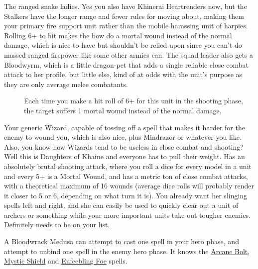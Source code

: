 The ranged snake ladies. Yes you also have Khinerai Heartrenders now, but the
Stalkers have the longer range and fewer rules for moving about, making them
your primary fire support unit rather than the mobile harassing unit of
harpies. Rolling 6+ to hit makes the bow do a mortal wound instead of the
normal damage, which is nice to have but shouldn't be relied upon since you
can't do massed ranged firepower like some other armies can. The squad leader
also gets a Bloodwyrm, which is a little dragon-pet that adds a single reliable
close combat attack to her profile, but little else, kind of at odds with the
unit's purpose as they are only average melee combatants.\\ 

\begin{description}
    \item [] Each time you make a hit roll
        of 6+ for this unit in the shooting phase, the target suffers 1 mortal
        wound instead of the normal damage.
\end{description}

Your generic Wizard, capable of tossing off a spell that makes it harder for
the enemy to wound you, which is also nice, plus Mindrazor or whatever you
like. Also, you know how Wizards tend to be useless in close combat and
shooting? Well this is Daughters of Khaine and everyone has to pull their
weight. Has an absolutely brutal shooting attack, where you roll a dice for
every model in a unit and every 5+ is a Mortal Wound, and has a metric ton of
close combat attacks, with a theoretical maximum of 16 wounds (average dice
rolls will probably render it closer to 5 or 6, depending on what turn it is).
You already want her slinging spells left and right, and she can easily be used
to quickly clear out a unit of archers or something while your more important
units take out tougher enemies. Definitely needs to be on your list.

A Bloodwrack Medusa can attempt to cast one spell in your hero phase, and
attempt to unbind one spell in the enemy hero phase. It knows the
\hyperref[arcane-bolt]{Arcane Bolt}, \hyperref[mystic-shield]{Mystic Shield}
and \hyperref[spell:enfeebling-foe]{Enfeebling Foe} spells.\\

